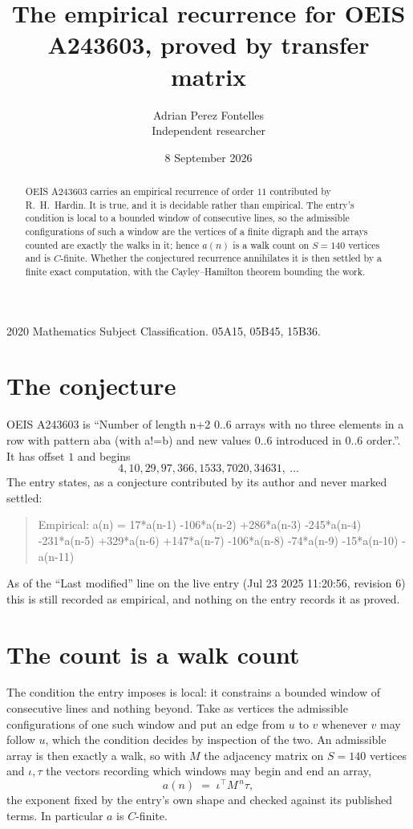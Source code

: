\documentclass[11pt,a4paper]{article}
\title{The empirical recurrence for OEIS A243603, proved by transfer matrix}
\author{Adrian Perez Fontelles\\ \small Independent researcher}
\date{8 September 2026}
\theoremstyle{plain}
\theoremstyle{definition}
\begin{document}
\maketitle

\begin{abstract}
OEIS A243603 carries an empirical recurrence of order $11$ contributed by R.~H.~Hardin. It is
true, and it is decidable rather than empirical. The entry's condition is local to a bounded window of consecutive lines, so
the admissible configurations of such a window are the vertices of a finite digraph and the
arrays counted are exactly the walks in it; hence $a(n)$ is a walk count on $S=140$ vertices
and is $C$-finite. Whether the conjectured recurrence annihilates it is then settled by a
finite exact computation, with the Cayley--Hamilton theorem bounding the work.
\end{abstract}

\noindent\small 2020 Mathematics Subject Classification. 05A15, 05B45, 15B36.\normalsize

\section{The conjecture}

OEIS A243603 is ``Number of length n+2 0..6 arrays with no three elements in a row with pattern aba (with a!=b) and new values 0..6 introduced in 0..6 order.''. It has offset $1$ and begins
\[
4, 10, 29, 97, 366, 1533, 7020, 34631,\ \dots
\]
The entry states, as a conjecture contributed by its author and never marked settled:
\begin{quote}
Empirical: a(n) = 17*a(n-1) -106*a(n-2) +286*a(n-3) -245*a(n-4) -231*a(n-5) +329*a(n-6) +147*a(n-7) -106*a(n-8) -74*a(n-9) -15*a(n-10) -a(n-11)
\end{quote}
As of the ``Last modified'' line on the live entry (Jul 23 2025 11:20:56, revision 6) this is still
recorded as empirical, and nothing on the entry records it as proved.

\section{The count is a walk count}

The condition the entry imposes is local: it constrains a bounded window of consecutive lines and nothing beyond. Take as
vertices the admissible configurations of one such window and put an edge from $u$ to $v$
whenever $v$ may follow $u$, which the condition decides by inspection of the two. An
admissible array is then exactly a walk, so with $M$ the adjacency matrix on $S=140$ vertices
and $\iota,\tau$ the vectors recording which windows may begin and end an array,
\[
a(n)\;=\;\iota^{\!\top}M^{\,n}\tau ,
\]
the exponent fixed by the entry's own shape and checked against its published terms. In
particular $a$ is $C$-finite.
\end{document}
